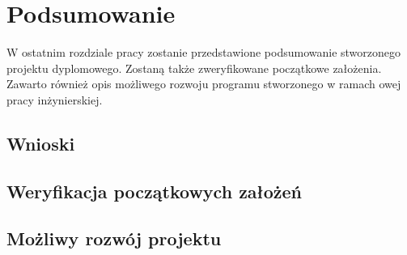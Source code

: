 \chapter{Podsumowanie}
\label{cha:podsumowanie}
W ostatnim rozdziale pracy zostanie przedstawione podsumowanie stworzonego projektu dyplomowego. Zostaną także zweryfikowane początkowe założenia. Zawarto również opis możliwego rozwoju programu stworzonego w ramach owej pracy inżynierskiej.
\section{Wnioski}

\section{Weryfikacja początkowych założeń}
\section{Możliwy rozwój projektu}

